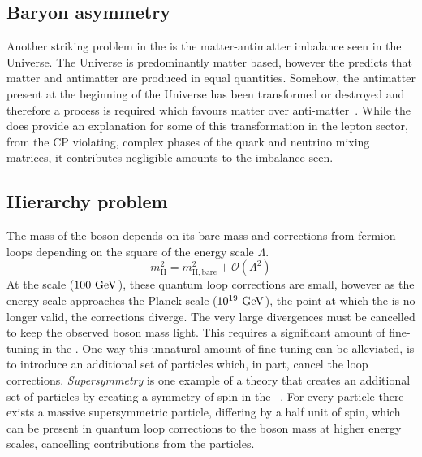 \subsection{Baryon asymmetry} %
\label{sub:baryon_asymmetry}

Another striking problem in the \SM{} is the matter-antimatter imbalance seen in the Universe.
The Universe is predominantly matter based, however the \SM{} predicts that matter and antimatter are produced in equal quantities.
Somehow, the antimatter present at the beginning of the Universe has been transformed or destroyed and therefore a process is required which favours matter over anti-matter~\cite{Th:BaryonAsym}.
While the \SM{} does provide an explanation for some of this transformation in the lepton sector, from the CP violating, complex phases of the quark and neutrino mixing matrices, it contributes negligible amounts to the imbalance seen.




\subsection{Hierarchy problem} %
\label{sub:hierarchy_problem}

The mass of the \Hboson{} boson depends on its bare mass and corrections from fermion loops depending on the square of the energy scale $\Lambda$.
\begin{equation*}
	m_{\mathrm{H}}^{2} = m_{\mathrm{H, bare}}^{2} + \mathcal{O}(\Lambda^{2})
\end{equation*}
At the \EWK{} scale ($100\mathrm{~Ge\hspace{-.08em}V}^{}$), these quantum loop corrections are small, however as the energy scale approaches the Planck scale ($10^{19}\mathrm{~Ge\hspace{-.08em}V}^{}$), the point at which the \SM{} is no longer valid, the corrections diverge.
The very large divergences must be cancelled to keep the observed \Hboson{} boson mass light.
This requires a significant amount of fine-tuning in the \SM{}.
One way this unnatural amount of fine-tuning can be alleviated, is to introduce an additional set of particles which, in part, cancel the loop corrections.
\textit{Supersymmetry} is one example of a theory that creates an additional set of particles by creating a symmetry of spin in the \SM{}~\cite{Th:SUSY}.
For every \SM{} particle there exists a massive supersymmetric particle, differing by a half unit of spin, which can be present in quantum loop corrections to the \Hboson{} boson mass at higher energy scales, cancelling contributions from the \SM{} particles.

